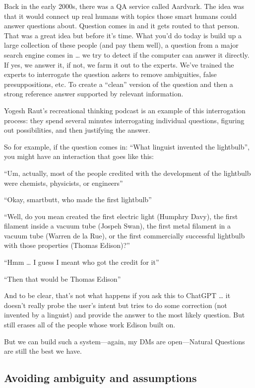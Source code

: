 Back in the early 2000s, there was a QA service called Aardvark.  The idea was that it would connect up real humans with topics those smart humans could answer questions about.  Question comes in and it gets routed to that person.  That was a great idea but before it’s time.  What you’d do today is build up a large collection of these people (and pay them well), a question from a major search engine comes in … we try to detect if the computer can answer it directly.  If yes, we answer it, if not, we farm it out to the experts.  We’ve trained the experts to interrogate the question askers to remove ambiguities, false presuppositions, etc.  To create a “clean” version of the question and then a strong reference answer supported by relevant information.

Yogesh Raut’s recreational thinking podcast is an example of this interrogation process: they spend several minutes interrogating individual questions, figuring out possibilities, and then justifying the answer.

So for example, if the question comes in: “What linguist invented the lightbulb”, you might have an interaction that goes like this:

“Um, actually, most of the people credited with the development of the lightbulb were chemists, physicists, or engineers”

“Okay, smartbutt, who made the first lightbulb”

“Well, do you mean created the first electric light (Humphry Davy), the first filament inside a vacuum tube (Jospeh Swan), the first metal filament in a vacuum tube (Warren de la Rue), or the first commercially successful lightbulb with those properties (Thomas Edison)?”

“Hmm … I guess I meant who got the credit for it”

“Then that would be Thomas Edison”

And to be clear, that’s not what happens if you ask this to ChatGPT … it doesn’t really probe the user’s intent but tries to do some correction (not invented by a linguist) and provide the answer to the most likely question.  But still erases all of the people whose work Edison built on.

But we can build such a system—again, my DMs are open—Natural Questions are still the best we have.



\subsection{Avoiding ambiguity and assumptions}
\label{sec:manchester:ambiguity}

